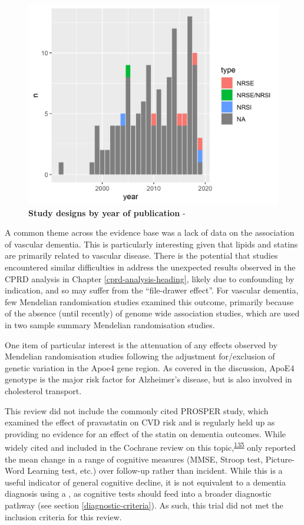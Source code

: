 \documentclass[a4paper, twoside]{templates/ociamthesis}
\begin{document}
\begin{figure}[H]
\includegraphics[width=1\linewidth]{figures/sys-rev/type_by_year} \caption[Study designs by year of publication]{\textbf{Study designs by year of publication} -}\label{fig:typeByYear}
\end{figure}

A common theme across the evidence base was a lack of data on the association of vascular dementia. This is particularly interesting given that lipids and statins are primarily related to vascular disease. There is the potential that studies encountered similar difficulties in address the unexpected results observed in the CPRD analysis in Chapter \ref{cprd-analysis-heading}, likely due to confounding by indication, and so may suffer from the ``file-drawer effect''. For vascular dementia, few Mendelian randomisation studies examined this outcome, primarily because of the absence (until recently) of genome wide association studies, which are used in two sample summary Mendelian randomisation studies.

One item of particular interest is the attenuation of any effects observed by Mendelian randomisation studies following the adjustment for/exclusion of genetic variation in the Apoe4 gene region. As covered in the discussion, ApoE4 genotype is the major risk factor for Alzheimer's disease, but is also involved in cholesterol transport.

This review did not include the commonly cited PROSPER study, which examined the effect of pravastatin on CVD risk and is regularly held up as providing no evidence for an effect of the statin on dementia outcomes. While widely cited and included in the Cochrane review on this topic,\textsuperscript{\protect\hyperlink{ref-mcguinness2016}{135}} only reported the mean change in a range of cognitive measures (MMSE, Stroop test, Picture-Word Learning test, etc.) over follow-up rather than incident. While this is a useful indicator of general cognitive decline, it is not equivalent to a dementia diagnosis using a , as cognitive tests should feed into a broader diagnostic pathway (see section \ref{diagnostic-criteria}). As such, this trial did not met the inclusion criteria for this review.
\end{document}

